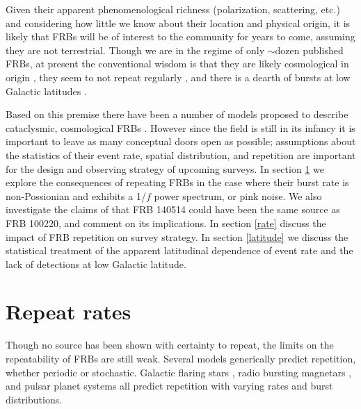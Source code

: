 \documentclass[useAMS,usenatbib]{mn2e}
\begin{document}
Given their apparent phenomenological richness
(polarization, scattering, etc.) and considering
how little we know about their location and physical 
origin, it is likely that FRBs will be of interest to the community for 
years to come, assuming they are not terrestrial.
Though we are in the regime of only $\sim$dozen published FRBs, 
at present the conventional wisdom is that they are likely cosmological
in origin \citep{2013Sci...341...53T}, they seem to not repeat regularly
\citep{2015MNRAS.454..457P}, and there is a dearth of bursts 
at low Galactic latitudes \citep{2014ApJ...789L..26P, 2014ApJ...792...19B, 2015MNRAS.451.3278M}.

Based on this premise there have been 
a number of models proposed to describe cataclysmic, cosmological 
FRBs \citep{2012ApJ...760...64M, 2013PASJ...65L..12T, 2014A&A...562A.137F, 2015ApJ...814L..20M}.
However since the field is still in its infancy it is important to
leave as many conceptual doors open as possible;
assumptions about the statistics of their event rate, 
spatial distribution, and repetition are important for the design
and observing strategy of upcoming surveys. In section \ref{repeat} we explore the 
consequences of repeating FRBs in the case where their 
burst rate is non-Possionian and exhibits a 1/$f$ power spectrum, 
or pink noise. We also investigate the claims of \cite{2015arXiv150701002M}
that FRB 140514 could have been the same source as FRB 100220, 
and comment on its implications. In section \ref{rate}
discuss the impact of FRB repetition on survey strategy. In section \ref{latitude}
we discuss the statistical treatment of the apparent latitudinal dependence 
of event rate and the lack of detections at low Galactic latitude.


\section{Repeat rates}
\label{repeat}

Though no source has been shown with certainty to repeat, 
the limits on the repeatability of FRBs are still weak. Several 
models generically predict repetition, whether periodic or stochastic. 
Galactic flaring stars \citep{2015arXiv150701002M}, radio bursting 
magnetars \citep{2007arXiv0710.2006P, 2015ApJ...807..179P}, and pulsar planet systems 
\citep{2014A&A...569A..86M} all predict repetition with varying 
rates and burst distributions. 
\end{document}
